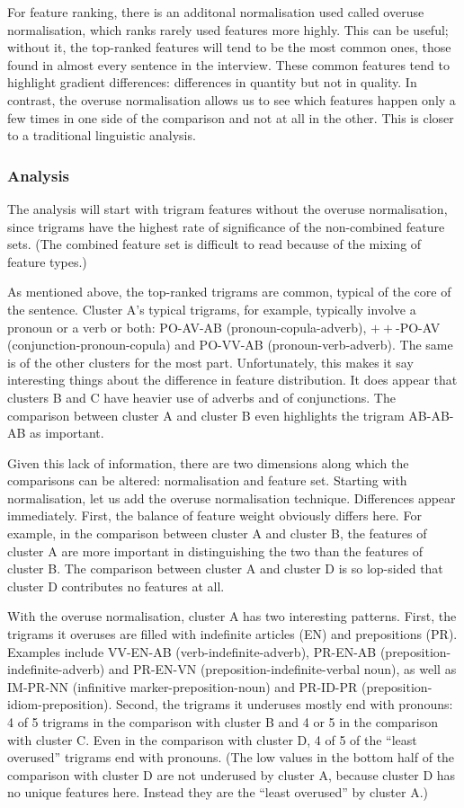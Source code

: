 For feature ranking, there is an additonal normalisation used
called overuse normalisation, which ranks rarely used features more
highly.  This can be useful; without it, the top-ranked features will
tend to be the most common ones, those found in almost every sentence
in the interview. These common features tend to highlight
gradient differences: differences in quantity but not in quality. In contrast,
the overuse normalisation allows us to see which features happen only
a few times in one side of the comparison and not at all in the
other. This is closer to a traditional linguistic analysis.

\subsubsection{Analysis}

The analysis will start with trigram features without the overuse
normalisation, since trigrams have the highest rate of significance of
the non-combined feature sets. (The combined feature set is difficult
to read because of the mixing of feature types.)

As mentioned above, the top-ranked trigrams are common, typical
of the core of the sentence. Cluster A's typical trigrams, for
example, typically involve a pronoun or a verb or both: PO-AV-AB
(pronoun-copula-adverb), $++$-PO-AV (conjunction-pronoun-copula) and
PO-VV-AB (pronoun-verb-adverb). The same is of the
other clusters for the most part. Unfortunately, this makes it say
interesting things about the difference in feature distribution. It
does appear that clusters B and C have heavier use of adverbs and of
conjunctions. The comparison between cluster A and cluster B even
highlights the trigram AB-AB-AB as important.

Given this lack of information, there are two dimensions along which
the comparisons can be altered: normalisation and feature
set. Starting with normalisation, let us add the overuse normalisation
technique. Differences appear immediately. First, the balance of
feature weight obviously differs here. For example, in the comparison
between cluster A and cluster B, the features of cluster A are more
important in distinguishing the two than the features of cluster
B. The comparison between cluster A and cluster D is so lop-sided that
cluster D contributes no features at all.

With the overuse normalisation, cluster A has two interesting
patterns. First, the trigrams it overuses are filled with indefinite
articles (EN) and prepositions (PR). Examples include VV-EN-AB
(verb-indefinite-adverb), PR-EN-AB (preposition-indefinite-adverb) and
PR-EN-VN (preposition-indefinite-verbal noun), as well as IM-PR-NN
(infinitive marker-preposition-noun) and PR-ID-PR
(preposition-idiom-preposition). Second, the trigrams it underuses
mostly end with pronouns: 4 of 5 trigrams in the comparison with
cluster B and 4 or 5 in the comparison with cluster C. Even in the
comparison with cluster D, 4 of 5 of the ``least overused'' trigrams
end with pronouns. (The low values in the bottom half of the
comparison with cluster D are not underused by cluster A, because
cluster D has no unique features here. Instead they are the ``least
overused'' by cluster A.)

